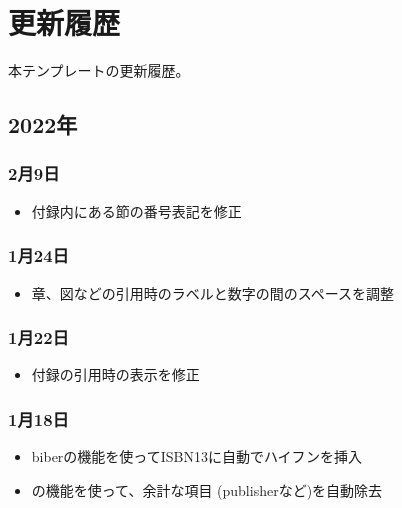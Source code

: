 \chapter{更新履歴}
\label{chap:change-log}

\begin{chapabst}
  本テンプレートの更新履歴。
\end{chapabst}

\section*{2022年}

\subsection*{2月9日}

\begin{itemize}
  \item 付録内にある節の番号表記を修正
\end{itemize}

\subsection*{1月24日}

\begin{itemize}
  \item 章、図などの引用時のラベルと数字の間のスペースを調整
\end{itemize}

\subsection*{1月22日}

\begin{itemize}
  \item 付録の引用時の表示を修正
\end{itemize}

\subsection*{1月18日}

\begin{itemize}
  \item biberの機能を使ってISBN13に自動でハイフンを挿入
  \item \biblatex の機能を使って、余計な項目 (publisherなど)を自動除去
\end{itemize}

